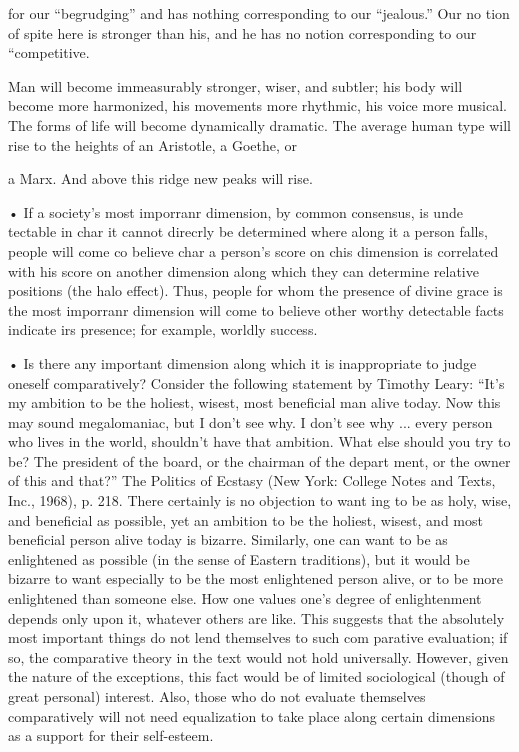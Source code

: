 \documentclass[11pt,openany]{book}
\begin{document}
{for our ``begrudging'' and has nothing corresponding to our ``jealous.'' Our no tion of spite here is stronger than his, and he has no notion corresponding to our ``competitive.\par

Man will become immeasurably stronger, wiser, and subtler; his body will become more harmonized, his movements more rhythmic, his voice more musical. The forms of life will become dynamically dramatic. The average human type will rise to the heights of an Aristotle, a Goethe, or\par

a Marx. And above this ridge new peaks will rise.\par

• If a society's most imporranr dimension, by common consensus, is unde tectable in char it cannot direcrly be determined where along it a person falls, people will come co believe char a person's score on chis dimension is correlated with his score on another dimension along which they can determine relative positions (the halo effect). Thus, people for whom the presence of divine grace is the most imporranr dimension will come to believe other worthy detectable facts indicate irs presence; for example, worldly success.\par

• Is there any important dimension along which it is inappropriate to judge oneself comparatively? Consider the following statement by Timothy Leary: ``It's my ambition to be the holiest, wisest, most beneficial man alive today. Now this may sound megalomaniac, but I don't see why. I don't see why ... every person who lives in the world, shouldn't have that ambition. What else should you try to be? The president of the board, or the chairman of the depart ment, or the owner of this and that?'' The Politics of Ecstasy (New York: College Notes and Texts, Inc., 1968), p. 218. There certainly is no objection to want ing to be as holy, wise, and beneficial as possible, yet an ambition to be the holiest, wisest, and most beneficial person alive today is bizarre. Similarly, one can want to be as enlightened as possible (in the sense of Eastern traditions), but it would be bizarre to want especially to be the most enlightened person alive, or to be more enlightened than someone else. How one values one's degree of enlightenment depends only upon it, whatever others are like. This suggests that the absolutely most important things do not lend themselves to such com parative evaluation; if so, the comparative theory in the text would not hold universally. However, given the nature of the exceptions, this fact would be of limited sociological (though of great personal) interest. Also, those who do not evaluate themselves comparatively will not need equalization to take place along certain dimensions as a support for their self-esteem.\par

}
\end{document}
